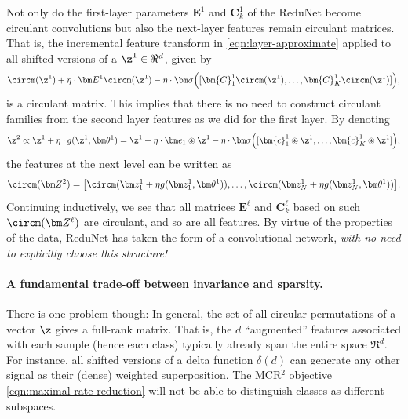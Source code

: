\documentclass[../../book-main.tex]{subfiles}
\begin{document}
Not only do the first-layer parameters $\bm E^1$ and $\bm{C}^1_k$ of
the ReduNet become circulant convolutions but also the next-layer
features remain circulant matrices.
That is, the incremental feature transform in
\eqref{eqn:layer-approximate} applied to all shifted versions of a
$\z^1 \in \Re^d$, given by
\begin{equation}
    \circm(\z^1) + \eta \cdot \bm E^1 \circm(\z^1) - \eta \cdot \bm
    \sigma \Big([\bm{C}_1^1 \circm(\z^1), \ldots, \bm{C}^1_K
    \circm(\z^1)] \Big),
\end{equation}
is a circulant matrix.  This implies that there is no need to
construct circulant families from the second layer features as we did
for the first layer.
By denoting
\begin{equation}
    \z^{2} \propto \z^{1} +\eta \cdot g(\z^{1}, \bm \theta^{1}) =
    \z^1 + \eta \cdot \bm e_{1} \circledast \z^{1} -  \eta \cdot \bm
    \sigma\Big([\bm{c}_{1}^{1} \circledast \z^{1}, \dots,
    \bm{c}^{1}_{K} \circledast \z^{1}]\Big),
    \label{eqn:approximate-convolution}
\end{equation}
the features at the next level can be written as
$$\circm(\bm Z^2) = \big[ \circm( \bm z_{1}^1 + \eta g( \bm z_{1}^1,
    \bm \theta^1)), \dots, \circm( \bm z_{N}^1 + \eta g(\bm z_{N}^1, \bm
\theta^1)) \big].$$
Continuing inductively, we see that all matrices $\bm E^\ell$ and
$\bm C^\ell_k$ based on such $\circm(\bm Z^\ell)$ are circulant, and
so are all features.
By virtue of the properties of the data, ReduNet has taken the form
of a convolutional network, {\em with no need to explicitly choose
this structure!}

\paragraph{A fundamental trade-off between invariance and sparsity.}
There is one problem though: In general, the set of all circular
permutations of a vector $\z$ gives a full-rank matrix. That is, the
$d$ ``augmented'' features associated with each sample (hence each
class) typically already span the entire space $\Re^d$. For instance,
all shifted versions of a delta function $\delta(d)$ can generate any
other signal as their (dense) weighted superposition. The MCR$^2$
objective \eqref{eqn:maximal-rate-reduction} will not be able to
distinguish classes as different subspaces.
\end{document}
